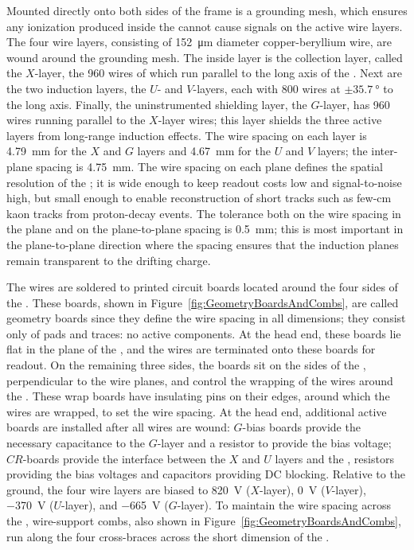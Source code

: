 Mounted directly onto both sides of the  frame is a grounding mesh, which ensures any ionization produced inside the  cannot cause signals on the active wire layers. The four wire layers, consisting of \SI{152}{\micro\meter} diameter copper-beryllium wire, are wound around the grounding mesh. The inside layer is the collection layer, called the $X$-layer, the 960 wires of which run parallel to the long axis of the . Next are the two induction layers, the $U$- and $V$-layers, each with 800 wires at $\pm\SI{35.7}{\degree}$ to the long axis. Finally, the uninstrumented shielding layer, the $G$-layer, has 960 wires running parallel to the $X$-layer wires; this layer shields the three active layers from long-range induction effects. The wire spacing on each layer is \SI{4.79}{\mm} for the $X$ and $G$ layers and \SI{4.67}{\mm} for the $U$ and $V$ layers; the inter-plane spacing is \SI{4.75}{\mm}. The wire spacing on each plane defines the spatial resolution of the ; it is wide enough to keep readout costs low and signal-to-noise high, but small enough to enable reconstruction of short tracks such as few-\si{\cm} kaon tracks from proton-decay events. The tolerance both on the wire spacing in the plane and on the plane-to-plane spacing is \SI{0.5}{\mm}; this is most important in the plane-to-plane direction where the spacing ensures that the induction planes remain transparent to the drifting charge.

The wires are soldered to printed circuit boards located around the four sides of the . These boards, shown in Figure~\ref{fig:GeometryBoardsAndCombs}, are called geometry boards since they define the wire spacing in all dimensions; they consist only of pads and traces: no active components. At the head end, these boards lie flat in the plane of the , and the wires are terminated onto these boards for readout. On the remaining three sides, the boards sit on the sides of the , perpendicular to the wire planes, and control the wrapping of the wires around the . These wrap boards have insulating pins on their edges, around which the wires are wrapped, to set the wire spacing. At the head end, additional active boards are installed after all wires are wound: $G$-bias boards provide the necessary capacitance to the $G$-layer and a resistor to provide the bias voltage; $CR$-boards provide the interface between the $X$ and $U$ layers and the , resistors providing the bias voltages and capacitors providing DC blocking. Relative to the ground, the four wire layers are biased to \SI{820}{\volt} ($X$-layer), \SI{0}{\volt} ($V$-layer), \SI{-370}{\volt} ($U$-layer), and \SI{-665}{\volt} ($G$-layer). To maintain the wire spacing across the , wire-support combs, also shown in Figure~\ref{fig:GeometryBoardsAndCombs}, run along the four cross-braces across the short dimension of the .

